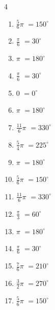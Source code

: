 \begin{multicols}{4}
\begin{enumerate}
  \item $\displaystyle \frac{5}{6}\pi$
        $\displaystyle =150^{\circ}$

  \item $\displaystyle \frac{\pi}{6}$
        $\displaystyle =30^{\circ}$

  \item $\displaystyle \pi$
        $\displaystyle =180^{\circ}$

  \item $\displaystyle \frac{\pi}{6}$
        $\displaystyle =30^{\circ}$

  \item $\displaystyle 0$
        $\displaystyle =0^{\circ}$

  \item $\displaystyle \pi$
        $\displaystyle =180^{\circ}$

  \item $\displaystyle \frac{11}{6}\pi$
        $\displaystyle =330^{\circ}$

  \item $\displaystyle \frac{5}{4}\pi$
        $\displaystyle =225^{\circ}$

  \item $\displaystyle \pi$
        $\displaystyle =180^{\circ}$

\columnbreak %

  \item $\displaystyle \frac{5}{6}\pi$
        $\displaystyle =150^{\circ}$

  \item $\displaystyle \frac{11}{6}\pi$
        $\displaystyle =330^{\circ}$

  \item $\displaystyle \frac{\pi}{3}$
        $\displaystyle =60^{\circ}$

  \item $\displaystyle \pi$
        $\displaystyle =180^{\circ}$

  \item $\displaystyle \frac{\pi}{6}$
        $\displaystyle =30^{\circ}$

  \item $\displaystyle \frac{7}{6}\pi$
        $\displaystyle =210^{\circ}$

  \item $\displaystyle \frac{3}{2}\pi$
        $\displaystyle =270^{\circ}$

  \item $\displaystyle \frac{5}{6}\pi$
        $\displaystyle =150^{\circ}$


\end{enumerate}
\end{multicols}
